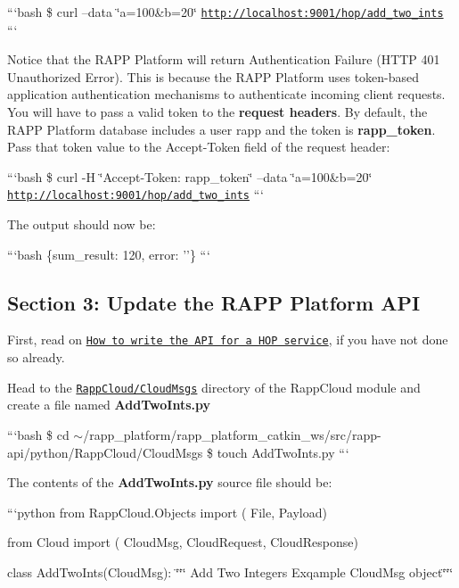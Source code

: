 ```bash \$ curl --data \char`\"{}a=100\&b=20\char`\"{} \href{http://localhost:9001/hop/add_two_ints}{\tt http\-://localhost\-:9001/hop/add\-\_\-two\-\_\-ints} ```

Notice that the R\-A\-P\-P Platform will return {\ttfamily Authentication Failure} (H\-T\-T\-P 401 Unauthorized Error). This is because the R\-A\-P\-P Platform uses token-\/based application authentication mechanisms to authenticate incoming client requests. You will have to pass a valid token to the {\bfseries request headers}. By default, the R\-A\-P\-P Platform database includes a user {\ttfamily rapp} and the token is {\bfseries rapp\-\_\-token}. Pass that token value to the {\ttfamily Accept-\/\-Token} field of the request header\-:

```bash \$ curl -\/\-H \char`\"{}\-Accept-\/\-Token\-: rapp\-\_\-token\char`\"{} --data \char`\"{}a=100\&b=20\char`\"{} \href{http://localhost:9001/hop/add_two_ints}{\tt http\-://localhost\-:9001/hop/add\-\_\-two\-\_\-ints} ```

The output should now be\-:

```bash \{sum\-\_\-result\-: 120, error\-: ''\} ```

\subsection*{Section 3\-: Update the R\-A\-P\-P Platform A\-P\-I}

First, read on \href{https://github.com/rapp-project/rapp-platform/wiki/How-to-write-the-API-for-a-HOP-service%3F}{\tt How to write the A\-P\-I for a H\-O\-P service}, if you have not done so already.

Head to the \href{https://github.com/rapp-project/rapp-api/tree/master/python/RappCloud/CloudMsgs}{\tt Rapp\-Cloud/\-Cloud\-Msgs} directory of the Rapp\-Cloud module and create a file named {\bfseries Add\-Two\-Ints.\-py}

```bash \$ cd $\sim$/rapp\-\_\-platform/rapp\-\_\-platform\-\_\-catkin\-\_\-ws/src/rapp-\/api/python/\-Rapp\-Cloud/\-Cloud\-Msgs \$ touch Add\-Two\-Ints.\-py ```

The contents of the {\bfseries Add\-Two\-Ints.\-py} source file should be\-:

```python from Rapp\-Cloud.\-Objects import ( File, Payload)

from Cloud import ( Cloud\-Msg, Cloud\-Request, Cloud\-Response)

class Add\-Two\-Ints(\-Cloud\-Msg)\-: \char`\"{}\char`\"{}\char`\"{} Add Two Integers Exqample Cloud\-Msg object\char`\"{}\char`\"{}\char`\"{}

